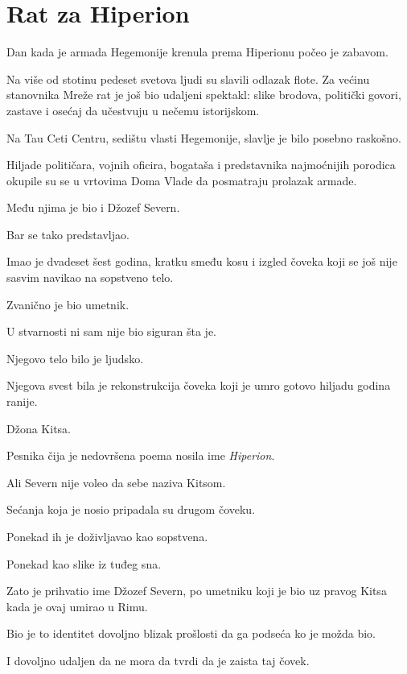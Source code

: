 
\chapter{Rat za Hiperion}


Dan kada je armada Hegemonije krenula prema Hiperionu počeo je zabavom.

Na više od stotinu pedeset svetova ljudi su slavili odlazak flote. Za većinu stanovnika Mreže rat je još bio udaljeni spektakl: slike brodova, politički govori, zastave i osećaj da učestvuju u nečemu istorijskom.

Na Tau Ceti Centru, sedištu vlasti Hegemonije, slavlje je bilo posebno raskošno.

Hiljade političara, vojnih oficira, bogataša i predstavnika najmoćnijih porodica okupile su se u vrtovima Doma Vlade da posmatraju prolazak armade.

Među njima je bio i Džozef Severn.

Bar se tako predstavljao.

Imao je dvadeset šest godina, kratku smeđu kosu i izgled čoveka koji se još nije sasvim navikao na sopstveno telo.

Zvanično je bio umetnik.

U stvarnosti ni sam nije bio siguran šta je.

Njegovo telo bilo je ljudsko.

Njegova svest bila je rekonstrukcija čoveka koji je umro gotovo hiljadu godina ranije.

Džona Kitsa.

Pesnika čija je nedovršena poema nosila ime \emph{Hiperion}.

Ali Severn nije voleo da sebe naziva Kitsom.

Sećanja koja je nosio pripadala su drugom čoveku.

Ponekad ih je doživljavao kao sopstvena.

Ponekad kao slike iz tuđeg sna.

Zato je prihvatio ime Džozef Severn, po umetniku koji je bio uz pravog Kitsa kada je ovaj umirao u Rimu.

Bio je to identitet dovoljno blizak prošlosti da ga podseća ko je možda bio.

I dovoljno udaljen da ne mora da tvrdi da je zaista taj čovek.

